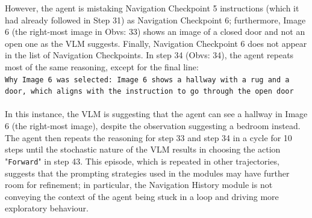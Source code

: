 \documentclass{svproc}
\begin{document}
    However, the agent is mistaking Navigation Checkpoint 5 instructions (which it had already followed in Step 31)  as Navigation Checkpoint 6; furthermore, Image 6 (the right-most image in Obvs: 33) shows an image of a closed door and not an open one as the VLM suggests. Finally, Navigation Checkpoint 6 does not appear in the list of Navigation Checkpoints. In step 34 (Obvs: 34), the agent repeats most of the same reasoning, except for the final line: \\
    \texttt{Why Image 6 was selected: Image 6 shows a hallway with a rug and a door, which aligns with the instruction to go through the open door}
    \\ \\
    In this instance, the VLM is suggesting that the agent can see a hallway in Image 6 (the right-most image), despite the observation suggesting a bedroom instead. The agent then repeats the reasoning for step 33 and step 34 in a cycle for 10 steps until the stochastic nature of the VLM results in choosing the action "\texttt{Forward}" in step 43. This episode, which is repeated in other trajectories, suggests that the prompting strategies used in the modules may have further room for refinement; in particular, the Navigation History module is not conveying the context of the agent being stuck in a loop and driving more exploratory behaviour.
\end{document}
